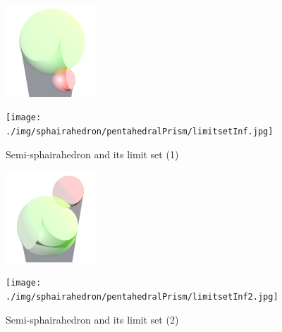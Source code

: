 \documentclass[suppldata, dvipdfmx]{interact}
\theoremstyle{plain}%
\theoremstyle{definition}
\theoremstyle{remark}
\theoremstyle{problemstyle}
\begin{document}
\begin{figure}[h!tbp]
 \begin{minipage}{0.48\textwidth}
  \begin{minipage}[t]{0.23\textwidth}
   \centering
   \includegraphics[width=1.35in, height=1.35in, keepaspectratio]{./img/sphairahedron/pentahedralPrism/sphairahedronInf.jpg}
   \label{fig:pentahedralPrismInfPositiveSphairahedron}
  \end{minipage}
  \hspace*{\fill}
  \begin{minipage}[t]{0.23\textwidth}
   \centering
   \texttt{[image: ./img/sphairahedron/pentahedralPrism/limitsetInf.jpg]}
   \label{fig:pentahedralPrismInfPositiveLimit}
  \end{minipage}
  \hspace*{\fill}
  \caption{Semi-sphairahedron and its limit set (1)}
  \label{fig:pentahedralPrismInfPositive}
 \end{minipage}
 \hspace*{\fill}
 \begin{minipage}{0.48\textwidth}
  \begin{minipage}[t]{0.23\textwidth}
   \centering
   \includegraphics[width=1.35in, height=1.35in, keepaspectratio]{./img/sphairahedron/pentahedralPrism/sphairahedronInf2.jpg}
   \label{fig:pentahedralPrismInfSphairahedron4}
  \end{minipage}
  \hspace*{\fill}
  \begin{minipage}[t]{0.23\textwidth}
   \centering
   \texttt{[image: ./img/sphairahedron/pentahedralPrism/limitsetInf2.jpg]}
   \label{fig:pentahedralPrismInfLimit4}
  \end{minipage}
  \hspace*{\fill}
  \caption{Semi-sphairahedron and its limit set (2)}
  \label{fig:pentahedralPrismInfNeg}
 \end{minipage}
\end{figure}
\end{document}
